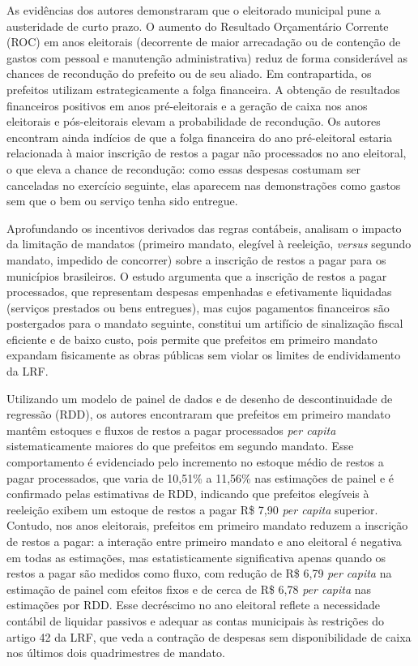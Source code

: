 As evidências dos autores demonstraram que o eleitorado municipal pune a austeridade de curto prazo. O aumento do Resultado Orçamentário Corrente (ROC) em anos eleitorais (decorrente de maior arrecadação ou de contenção de gastos com pessoal e manutenção administrativa) reduz de forma considerável as chances de recondução do prefeito ou de seu aliado. Em contrapartida, os prefeitos utilizam estrategicamente a folga financeira. A obtenção de resultados financeiros positivos em anos pré-eleitorais e a geração de caixa nos anos eleitorais e pós-eleitorais elevam a probabilidade de recondução. Os autores encontram ainda indícios de que a folga financeira do ano pré-eleitoral estaria relacionada à maior inscrição de restos a pagar não processados no ano eleitoral, o que eleva a chance de recondução: como essas despesas costumam ser canceladas no exercício seguinte, elas aparecem nas demonstrações como gastos sem que o bem ou serviço tenha sido entregue.

Aprofundando os incentivos derivados das regras contábeis, \textcite{almeida2023} analisam o impacto da limitação de mandatos (primeiro mandato, elegível à reeleição, \textit{versus} segundo mandato, impedido de concorrer) sobre a inscrição de restos a pagar para os municípios brasileiros. O estudo argumenta que a inscrição de restos a pagar processados, que representam despesas empenhadas e efetivamente liquidadas (serviços prestados ou bens entregues), mas cujos pagamentos financeiros são postergados para o mandato seguinte, constitui um artifício de sinalização fiscal eficiente e de baixo custo, pois permite que prefeitos em primeiro mandato expandam fisicamente as obras públicas sem violar os limites de endividamento da LRF.

Utilizando um modelo de painel de dados e de desenho de descontinuidade de regressão (RDD), os autores encontraram que prefeitos em primeiro mandato mantêm estoques e fluxos de restos a pagar processados \textit{per capita} sistematicamente maiores do que prefeitos em segundo mandato. Esse comportamento é evidenciado pelo incremento no estoque médio de restos a pagar processados, que varia de 10,51\% a 11,56\% nas estimações de painel e é confirmado pelas estimativas de RDD, indicando que prefeitos elegíveis à reeleição exibem um estoque de restos a pagar R\$ 7,90 \textit{per capita} superior. Contudo, nos anos eleitorais, prefeitos em primeiro mandato reduzem a inscrição de restos a pagar: a interação entre primeiro mandato e ano eleitoral é negativa em todas as estimações, mas estatisticamente significativa apenas quando os restos a pagar são medidos como fluxo, com redução de R\$ 6,79 \textit{per capita} na estimação de painel com efeitos fixos e de cerca de R\$ 6,78 \textit{per capita} nas estimações por RDD. Esse decréscimo no ano eleitoral reflete a necessidade contábil de liquidar passivos e adequar as contas municipais às restrições do artigo 42 da LRF, que veda a contração de despesas sem disponibilidade de caixa nos últimos dois quadrimestres de mandato.

